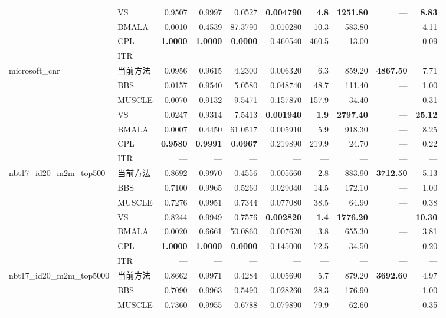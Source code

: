 \begin{table}[htbp]
\begin{tabular}{llrrrrrrrr}
 & VS & 0.9507 & 0.9997 & 0.0527 & \textbf{0.004790} & \textbf{4.8} & \textbf{1251.80} & — & \textbf{8.83} \\
 & BMALA & 0.0010 & 0.4539 & 87.3790 & 0.010280 & 10.3 & 583.80 & — & 4.11 \\
 & CPL & \textbf{1.0000} & \textbf{1.0000} & \textbf{0.0000} & 0.460540 & 460.5 & 13.00 & — & 0.09 \\
 & ITR & — & — & — & — & — & — & — & — \\
\midrule
\multirow{7}{*}{microsoft\_cnr} & 当前方法 & 0.0956 & 0.9615 & 4.2300 & 0.006320 & 6.3 & 859.20 & \textbf{4867.50} & 7.71 \\
 & BBS & 0.0157 & 0.9540 & 5.0580 & 0.048740 & 48.7 & 111.40 & — & 1.00 \\
 & MUSCLE & 0.0070 & 0.9132 & 9.5471 & 0.157870 & 157.9 & 34.40 & — & 0.31 \\
 & VS & 0.0247 & 0.9314 & 7.5413 & \textbf{0.001940} & \textbf{1.9} & \textbf{2797.40} & — & \textbf{25.12} \\
 & BMALA & 0.0007 & 0.4450 & 61.0517 & 0.005910 & 5.9 & 918.30 & — & 8.25 \\
 & CPL & \textbf{0.9580} & \textbf{0.9991} & \textbf{0.0967} & 0.219890 & 219.9 & 24.70 & — & 0.22 \\
 & ITR & — & — & — & — & — & — & — & — \\
\midrule
\multirow{7}{*}{nbt17\_id20\_m2m\_top500} & 当前方法 & 0.8692 & 0.9970 & 0.4556 & 0.005660 & 2.8 & 883.90 & \textbf{3712.50} & 5.13 \\
 & BBS & 0.7100 & 0.9965 & 0.5260 & 0.029040 & 14.5 & 172.10 & — & 1.00 \\
 & MUSCLE & 0.7276 & 0.9951 & 0.7344 & 0.077080 & 38.5 & 64.90 & — & 0.38 \\
 & VS & 0.8244 & 0.9949 & 0.7576 & \textbf{0.002820} & \textbf{1.4} & \textbf{1776.20} & — & \textbf{10.30} \\
 & BMALA & 0.0020 & 0.6661 & 50.0860 & 0.007620 & 3.8 & 655.30 & — & 3.81 \\
 & CPL & \textbf{1.0000} & \textbf{1.0000} & \textbf{0.0000} & 0.145000 & 72.5 & 34.50 & — & 0.20 \\
 & ITR & — & — & — & — & — & — & — & — \\
\midrule
\multirow{7}{*}{nbt17\_id20\_m2m\_top5000} & 当前方法 & 0.8662 & 0.9971 & 0.4284 & 0.005690 & 5.7 & 879.20 & \textbf{3692.60} & 4.97 \\
 & BBS & 0.7090 & 0.9963 & 0.5490 & 0.028260 & 28.3 & 176.90 & — & 1.00 \\
 & MUSCLE & 0.7360 & 0.9955 & 0.6788 & 0.079890 & 79.9 & 62.60 & — & 0.35 \\

\end{tabular}
\end{table}
